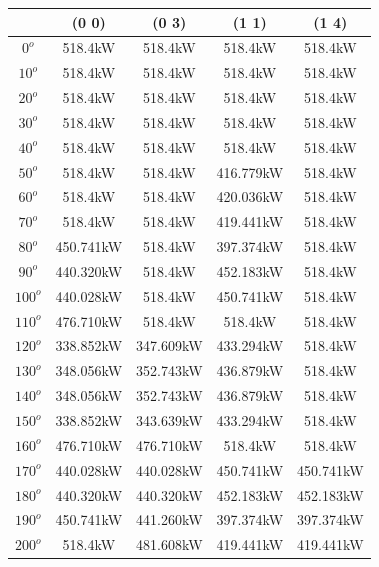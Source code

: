         \singlespacing
        \begin{table}[H]
        	\centering
        	\begin{tabular}{|c|c|c|c|c|} \hline
        			& (0 0)		& (0 3)		& (1 1)		& (1 4)			\\ \hline
        		$0^o$	& 518.4kW	& 518.4kW	& 518.4kW	& 518.4kW	\\ \hline
        		$10^o$	& 518.4kW	& 518.4kW	& 518.4kW	& 518.4kW	\\ \hline
        		$20^o$	& 518.4kW	& 518.4kW	& 518.4kW	& 518.4kW	\\ \hline
        		$30^o$	& 518.4kW	& 518.4kW	& 518.4kW	& 518.4kW	\\ \hline
        		$40^o$	& 518.4kW	& 518.4kW	& 518.4kW	& 518.4kW	\\ \hline
        		$50^o$	& 518.4kW	& 518.4kW	& 416.779kW	& 518.4kW	\\ \hline
        		$60^o$	& 518.4kW	& 518.4kW	& 420.036kW	& 518.4kW	\\ \hline
        		$70^o$	& 518.4kW	& 518.4kW	& 419.441kW	& 518.4kW	\\ \hline
        		$80^o$	& 450.741kW	& 518.4kW	& 397.374kW	& 518.4kW	\\ \hline
        		$90^o$	& 440.320kW	& 518.4kW	& 452.183kW	& 518.4kW	\\ \hline
        		$100^o$	& 440.028kW	& 518.4kW	& 450.741kW	& 518.4kW	\\ \hline
        		$110^o$	& 476.710kW	& 518.4kW	& 518.4kW	& 518.4kW	\\ \hline
        		$120^o$	& 338.852kW	& 347.609kW	& 433.294kW	& 518.4kW	\\ \hline
        		$130^o$	& 348.056kW	& 352.743kW	& 436.879kW	& 518.4kW	\\ \hline
        		$140^o$	& 348.056kW	& 352.743kW	& 436.879kW	& 518.4kW	\\ \hline
        		$150^o$	& 338.852kW	& 343.639kW	& 433.294kW	& 518.4kW	\\ \hline
        		$160^o$	& 476.710kW	& 476.710kW	& 518.4kW	& 518.4kW	\\ \hline
        		$170^o$	& 440.028kW	& 440.028kW	& 450.741kW	& 450.741kW	\\ \hline
        		$180^o$	& 440.320kW	& 440.320kW	& 452.183kW	& 452.183kW	\\ \hline
        		$190^o$	& 450.741kW	& 441.260kW	& 397.374kW	& 397.374kW	\\ \hline
        		$200^o$	& 518.4kW	& 481.608kW	& 419.441kW	& 419.441kW	\\ \hline

\end{tabular}
\end{table}
